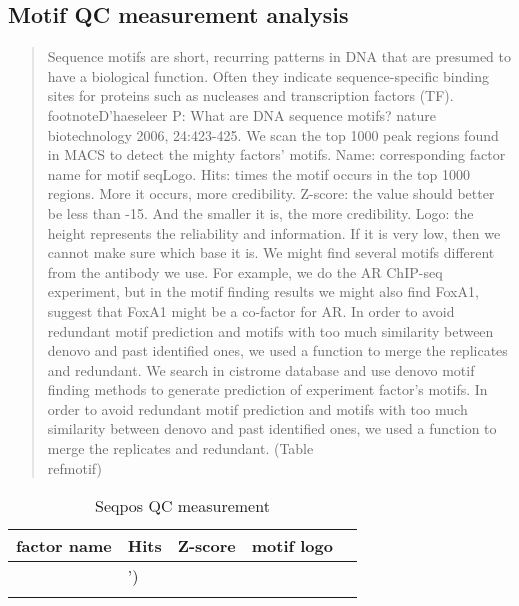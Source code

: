 \documentclass[11pt,a4paper]{article}
\begin{document}
\subsection{Motif QC measurement analysis}
\begin{quotation}
Sequence motifs are short, recurring patterns in DNA that are presumed to have a biological function. Often they indicate sequence-specific binding sites for proteins such as nucleases and transcription factors (TF). \\footnote{D'haeseleer P: What are DNA sequence motifs? nature biotechnology 2006, 24:423-425.}
We scan the top 1000 peak regions found in MACS to detect the mighty factors' motifs. 
Name: corresponding factor name for motif seqLogo.
Hits: times the motif occurs in the top 1000 regions. More it occurs, more credibility.
Z-score: the value should better be less than -15. And the smaller it is, the more credibility.
Logo: the height represents the reliability and information. If it is very low, then we cannot make sure which base it is.
We might find several motifs different from the antibody we use. For example, we do the AR ChIP-seq experiment, but in the motif finding results we might also find FoxA1, suggest that FoxA1 might be a co-factor for AR. 
In order to avoid redundant motif prediction and motifs with too much similarity between denovo and past identified ones, we used a  function to merge the replicates and redundant. 
We search in cistrome database and use denovo motif finding methods 
to generate prediction of experiment factor's motifs. 
In order to avoid redundant motif prediction and motifs with too much similarity between denovo and past identified ones, we used a  function to merge the replicates and redundant. (Table ~\\ref{motif})
\end{quotation}
\newpage

\begin{table}[h]
        \caption{Seqpos QC measurement} \label{motif}
\begin{tabularx}{1.2\textwidth}{ |X|R|X|X|X| }
\hline
factor name & Hits & Z-score & motif logo \tabularnewline
\hline
{}
 \\
\hline
{}
\end{tabularx}
\end{table}
\end{document}
